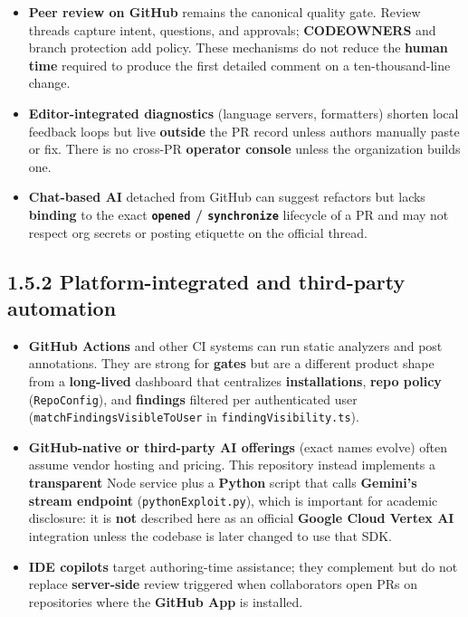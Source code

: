 \documentclass[11pt,a4paper]{report}
\begin{document}
\begin{itemize}
\item \textbf{Peer review on GitHub} remains the canonical quality gate. Review threads capture intent, questions, and approvals; \textbf{CODEOWNERS} and branch protection add policy. These mechanisms do not reduce the \textbf{human time} required to produce the first detailed comment on a ten-thousand-line change.
\item \textbf{Editor-integrated diagnostics} (language servers, formatters) shorten local feedback loops but live \textbf{outside} the PR record unless authors manually paste or fix. There is no cross-PR \textbf{operator console} unless the organization builds one.
\item \textbf{Chat-based AI} detached from GitHub can suggest refactors but lacks \textbf{binding} to the exact \textbf{\texttt{opened} / \texttt{synchronize}} lifecycle of a PR and may not respect org secrets or posting etiquette on the official thread.
\end{itemize}


\subsection{1.5.2 Platform-integrated and third-party automation}


\begin{itemize}
\item \textbf{GitHub Actions} and other CI systems can run static analyzers and post annotations. They are strong for \textbf{gates} but are a different product shape from a \textbf{long-lived} dashboard that centralizes \textbf{installations}, \textbf{repo policy} (\texttt{RepoConfig}), and \textbf{findings} filtered per authenticated user (\texttt{matchFindingsVisibleToUser} in \texttt{findingVisibility.ts}).
\item \textbf{GitHub-native or third-party AI offerings} (exact names evolve) often assume vendor hosting and pricing. This repository instead implements a \textbf{transparent} Node service plus a \textbf{Python} script that calls \textbf{Gemini’s stream endpoint} (\texttt{pythonExploit.py}), which is important for academic disclosure: it is \textbf{not} described here as an official \textbf{Google Cloud Vertex AI} integration unless the codebase is later changed to use that SDK.
\item \textbf{IDE copilots} target authoring-time assistance; they complement but do not replace \textbf{server-side} review triggered when collaborators open PRs on repositories where the \textbf{GitHub App} is installed.
\end{itemize}
\end{document}

